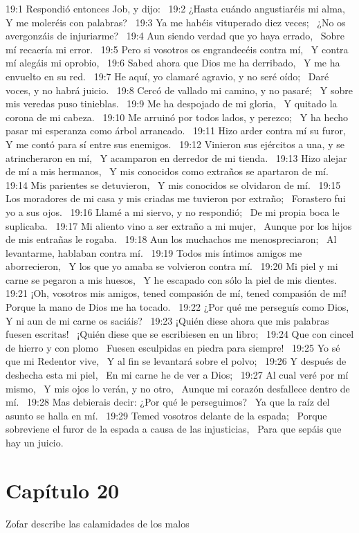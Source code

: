 19:1 Respondió entonces Job, y dijo:  
19:2 ¿Hasta cuándo angustiaréis mi alma,  
Y me moleréis con palabras?  
19:3 Ya me habéis vituperado diez veces;  
¿No os avergonzáis de injuriarme?  
19:4 Aun siendo verdad que yo haya errado,  
Sobre mí recaería mi error.  
19:5 Pero si vosotros os engrandecéis contra mí,  
Y contra mí alegáis mi oprobio,  
19:6 Sabed ahora que Dios me ha derribado,  
Y me ha envuelto en su red.  
19:7 He aquí, yo clamaré agravio, y no seré oído;  
Daré voces, y no habrá juicio.  
19:8 Cercó de vallado mi camino, y no pasaré;  
Y sobre mis veredas puso tinieblas.  
19:9 Me ha despojado de mi gloria,  
Y quitado la corona de mi cabeza.  
19:10 Me arruinó por todos lados, y perezco;  
Y ha hecho pasar mi esperanza como árbol arrancado.  
19:11 Hizo arder contra mí su furor,  
Y me contó para sí entre sus enemigos.  
19:12 Vinieron sus ejércitos a una, y se atrincheraron en mí,  
Y acamparon en derredor de mi tienda.  
19:13 Hizo alejar de mí a mis hermanos,  
Y mis conocidos como extraños se apartaron de mí.  
19:14 Mis parientes se detuvieron,  
Y mis conocidos se olvidaron de mí.  
19:15 Los moradores de mi casa y mis criadas me tuvieron por extraño;  
Forastero fui yo a sus ojos.  
19:16 Llamé a mi siervo, y no respondió;  
De mi propia boca le suplicaba.  
19:17 Mi aliento vino a ser extraño a mi mujer,  
Aunque por los hijos de mis entrañas le rogaba.  
19:18 Aun los muchachos me menospreciaron;  
Al levantarme, hablaban contra mí.  
19:19 Todos mis íntimos amigos me aborrecieron,  
Y los que yo amaba se volvieron contra mí.  
19:20 Mi piel y mi carne se pegaron a mis huesos,  
Y he escapado con sólo la piel de mis dientes.  
19:21 ¡Oh, vosotros mis amigos, tened compasión de mí, tened compasión de mí!  
Porque la mano de Dios me ha tocado.  
19:22 ¿Por qué me perseguís como Dios,  
Y ni aun de mi carne os saciáis?  
19:23 ¡Quién diese ahora que mis palabras fuesen escritas!  
¡Quién diese que se escribiesen en un libro;  
19:24 Que con cincel de hierro y con plomo  
Fuesen esculpidas en piedra para siempre!  
19:25 Yo sé que mi Redentor vive,  
Y al fin se levantará sobre el polvo;  
19:26 Y después de deshecha esta mi piel,  
En mi carne he de ver a Dios;  
19:27 Al cual veré por mí mismo,  
Y mis ojos lo verán, y no otro,  
Aunque mi corazón desfallece dentro de mí.  
19:28 Mas debierais decir: ¿Por qué le perseguimos?  
Ya que la raíz del asunto se halla en mí.  
19:29 Temed vosotros delante de la espada;  
Porque sobreviene el furor de la espada a causa de las injusticias,  
Para que sepáis que hay un juicio.  
\section*{Capítulo 20 }
Zofar describe las calamidades de los malos  

